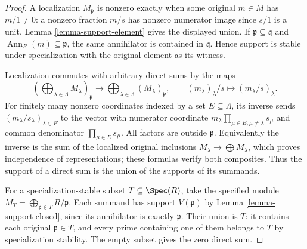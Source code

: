 \begin{proof}
A localization $M_{\mathfrak p}$ is nonzero exactly when
some original $m\in M$ has $m/1\ne0$: a nonzero fraction
$m/s$ has nonzero numerator image since $s/1$ is a unit.
Lemma \ref{lemma-support-element} gives the displayed union.
If $\mathfrak p\subseteq\mathfrak q$ and
$\operatorname{Ann}_R(m)\subseteq\mathfrak p$, the same
annihilator is contained in $\mathfrak q$. Hence support
is stable under specialization with the original element
as its witness.

Localization commutes with arbitrary direct sums by the
maps
$$
(\bigoplus_{\lambda\in\Lambda}M_\lambda)_{\mathfrak p}
\longrightarrow\bigoplus_{\lambda\in\Lambda}(M_\lambda)_{\mathfrak p},
\qquad (m_\lambda)_\lambda/s\longmapsto(m_\lambda/s)_\lambda.
$$
For finitely many nonzero coordinates indexed by a set
$E\subseteq\Lambda$, its inverse sends
$(m_\lambda/s_\lambda)_{\lambda\in E}$ to the vector
with numerator coordinate
$m_\lambda\prod_{\mu\in E,\mu\ne\lambda}s_\mu$
and common denominator $\prod_{\mu\in E}s_\mu$.
All factors are outside $\mathfrak p$.
Equivalently the inverse is the sum of the localized
original inclusions $M_\lambda\to\bigoplus M_\lambda$,
which proves independence of representations; these
formulas verify both composites. Thus the support of
a direct sum is the union of the supports of its summands.

For a specialization-stable subset $T\subseteq\Spec(R)$,
take the specified module
$M_T=\bigoplus_{\mathfrak p\in T}R/\mathfrak p$.
Each summand has support $V(\mathfrak p)$ by
Lemma \ref{lemma-support-closed}, since its annihilator
is exactly $\mathfrak p$. Their union is $T$: it contains
each original $\mathfrak p\in T$, and every prime
containing one of them belongs to $T$ by specialization
stability. The empty subset gives the zero direct sum.
\end{proof}